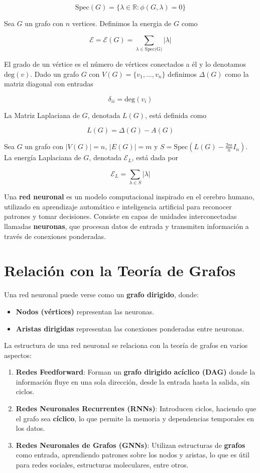 \documentclass{article}
\begin{document}
$$\text{Spec}(G) = \lbrace \lambda \in \mathbb{R} : \phi(G, \lambda) = 0 \rbrace$$

Sea $G$ un grafo con $n$ vertices. Definimos la energia de $G$ como

$$\mathcal{E} = \mathcal{E}(G) = \sum_{\lambda \in \text{Spec(G)}} |\lambda|$$

El grado de un vértice es el número de vértices conectados a él y lo denotamos $\text{deg}(v)$. Dado un grafo $G$ con $V(G) = \lbrace v_1, ... , v_n \rbrace$ definimos $\Delta(G)$ como la matriz diagonal con entradas

$$\delta_{ii} = \text{deg}(v_i)$$

La Matriz Laplaciana de $G$, denotada $L(G)$, está definida como

$$L(G) = \Delta(G) - A(G)$$

Sea $G$ un grafo con $|V(G)| = n$, $|E(G)| = m$ y $S = \text{Spec}(L(G) - \frac{2m}{n}I_n)$. La energía Laplaciana de $G$, denotada $\mathcal{E}_L$, está dada por

$$\mathcal{E}_L = \sum_{\lambda \in S} |\lambda|$$

Una \textbf{red neuronal} es un modelo computacional inspirado en el cerebro humano, utilizado en aprendizaje automático e inteligencia artificial para reconocer patrones y tomar decisiones. Consiste en capas de unidades interconectadas llamadas \textbf{neuronas}, que procesan datos de entrada y transmiten información a través de conexiones ponderadas.

\section*{Relación con la Teoría de Grafos}

Una red neuronal puede verse como un \textbf{grafo dirigido}, donde:
\begin{itemize}
    \item \textbf{Nodos (vértices)} representan las neuronas.
    \item \textbf{Aristas dirigidas} representan las conexiones ponderadas entre neuronas.
\end{itemize}

La estructura de una red neuronal se relaciona con la teoría de grafos en varios aspectos:
\begin{enumerate}
    \item \textbf{Redes Feedforward}: Forman un \textbf{grafo dirigido acíclico (DAG)} donde la información fluye en una sola dirección, desde la entrada hasta la salida, sin ciclos.
    \item \textbf{Redes Neuronales Recurrentes (RNNs)}: Introducen ciclos, haciendo que el grafo sea \textbf{cíclico}, lo que permite la memoria y dependencias temporales en los datos.
    \item \textbf{Redes Neuronales de Grafos (GNNs)}: Utilizan estructuras de \textbf{grafos} como entrada, aprendiendo patrones sobre los nodos y aristas, lo que es útil para redes sociales, estructuras moleculares, entre otros.
\end{enumerate}
\end{document}
